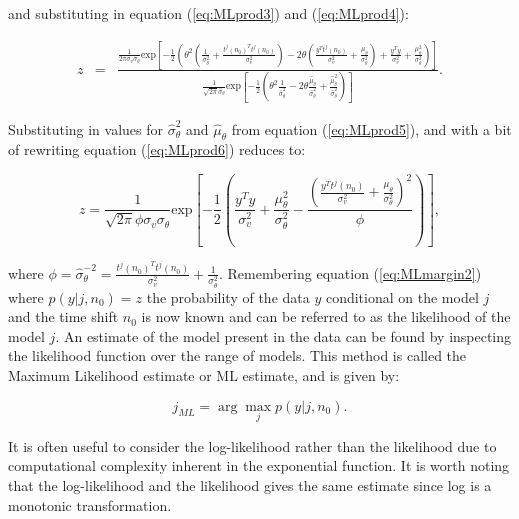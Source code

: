 and substituting in equation (\ref{eq:MLprod3}) and (\ref{eq:MLprod4}):

\begin{eqnarray}\label{eq:MLprod6}
z &=& \frac{\frac{1}{2\pi \sigma_v \sigma_\theta} \textrm{exp}\left[-\frac{1}{2}\left(\theta^2 \left(\frac{1}{\sigma_\theta^2}+\frac{t^j(n_0)^T t^j(n_0)}{\sigma_v^2}\right) - 2\theta\left(\frac{y^T t^j(n_0)}{\sigma_v^2}+\frac{\mu_\theta}{\sigma_\theta^2}\right) + \frac{y^T y}{\sigma_v^2} +\frac{\mu_\theta^2}{\sigma_\theta^2}\right)\right]}{\frac{1}{\sqrt{2 \pi}\hat{\sigma}_\theta}\textrm{exp}\left[-\frac{1}{2}\left(\theta^2\frac{1}{\hat{\sigma}^2_\theta} - 2\theta\frac{\hat{\mu}_\theta}{\hat{\sigma}^2_\theta} + \frac{\hat{\mu}_\theta^2}{\hat{\sigma}^2_\theta}  \right)\right]}.
\end{eqnarray}

Substituting in values for $\hat{\sigma}^2_\theta$ and $\hat{\mu}_\theta$ from equation (\ref{eq:MLprod5}), and with a bit of rewriting equation (\ref{eq:MLprod6}) reduces to:

\begin{equation}\label{eq:MLprod7}
z = \frac{1}{\sqrt{2 \pi}\phi \sigma_v \sigma_\theta}\textrm{exp}\left[-\frac{1}{2}\left(\frac{y^T y}{\sigma^2_v}+\frac{\mu_\theta^2}{\sigma_\theta^2} - \frac{\left(\frac{y^T t^j(n_0)}{\sigma_v^2}+\frac{\mu_\theta}{\sigma_\theta^2}\right)^2}{\phi}\right)\right],
\end{equation}

where $\phi = \hat{\sigma}^{-2}_\theta = \frac{t^j(n_0)^Tt^j(n_0)}{\sigma_v^2} + \frac{1}{\sigma_\theta^2}$. Remembering equation (\ref{eq:MLmargin2}) where $p(y|j,n_0) = z$ the probability of the data $y$ conditional on the model $j$ and the time shift $n_0$ is now known and can be referred to as the likelihood of the model $j$. An estimate of the model present in the data can be found by inspecting the likelihood function over the range of models. This method is called the Maximum Likelihood estimate or ML estimate, and is given by:

\begin{equation}\label{eq:MLdefinition}
j_{ML} = \arg\max_j p(y|j,n_0).
\end{equation}

It is often useful to consider the log-likelihood rather than the likelihood due to computational complexity inherent in the exponential function. It is worth noting that the log-likelihood and the likelihood gives the same estimate since log is a monotonic transformation.

